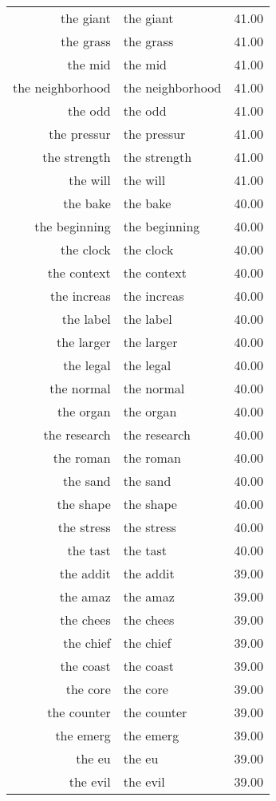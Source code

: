\begin{table}[ht]
\begin{tabular}{rlr}
  the giant & the giant & 41.00 \\ 
  the grass & the grass & 41.00 \\ 
  the mid & the mid & 41.00 \\ 
  the neighborhood & the neighborhood & 41.00 \\ 
  the odd & the odd & 41.00 \\ 
  the pressur & the pressur & 41.00 \\ 
  the strength & the strength & 41.00 \\ 
  the will & the will & 41.00 \\ 
  the bake & the bake & 40.00 \\ 
  the beginning & the beginning & 40.00 \\ 
  the clock & the clock & 40.00 \\ 
  the context & the context & 40.00 \\ 
  the increas & the increas & 40.00 \\ 
  the label & the label & 40.00 \\ 
  the larger & the larger & 40.00 \\ 
  the legal & the legal & 40.00 \\ 
  the normal & the normal & 40.00 \\ 
  the organ & the organ & 40.00 \\ 
  the research & the research & 40.00 \\ 
  the roman & the roman & 40.00 \\ 
  the sand & the sand & 40.00 \\ 
  the shape & the shape & 40.00 \\ 
  the stress & the stress & 40.00 \\ 
  the tast & the tast & 40.00 \\ 
  the addit & the addit & 39.00 \\ 
  the amaz & the amaz & 39.00 \\ 
  the chees & the chees & 39.00 \\ 
  the chief & the chief & 39.00 \\ 
  the coast & the coast & 39.00 \\ 
  the core & the core & 39.00 \\ 
  the counter & the counter & 39.00 \\ 
  the emerg & the emerg & 39.00 \\ 
  the eu & the eu & 39.00 \\ 
  the evil & the evil & 39.00 \\ 

\end{tabular}
\end{table}
